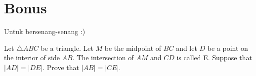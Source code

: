 \documentclass[12pt]{scrartcl}
\begin{document}
	\section{Bonus}
	Untuk bersenang-senang :)
	\begin{soalbaru}
	
	 Let $\triangle ABC$ be a triangle. Let $M$ be the midpoint of $BC$ and let $D$ be a point on the interior of side $AB$. The intersection of $AM$ and $CD$ is called E. Suppose that $|AD|=|DE|.$ Prove that $|AB|=|CE|.$
	
	
	\end{soalbaru}
\end{document}
